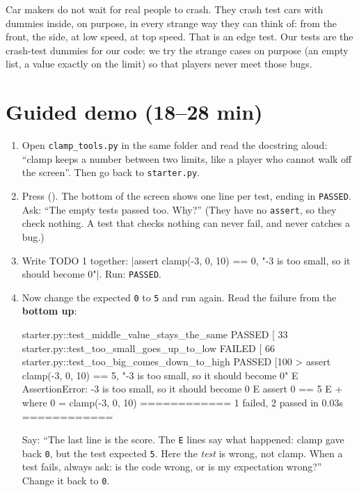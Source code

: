 \begin{analogy}
Car makers do not wait for real people to crash. They crash test cars with dummies inside, on purpose, in every strange way they can think of:
from the front, the side, at low speed, at top speed. That is an edge test. Our tests are the crash-test dummies for our code: we try the strange
cases on purpose (an empty list, a value exactly on the limit) so that players never meet those bugs.
\end{analogy}

\section{Guided demo (18--28 min)}
\begin{workedexample}
\begin{enumerate}[leftmargin=1.4em]
  \item Open \texttt{clamp\_tools.py} in the same folder and read the docstring aloud: \enquote{clamp keeps a number between two limits, like a player who
        cannot walk off the screen}. Then go back to \texttt{starter.py}.
  \item Press  (). The bottom of the screen shows one line per test, ending in \texttt{PASSED}. Ask: \enquote{The empty tests passed too.
        Why?} (They have no \texttt{assert}, so they check nothing. A test that checks nothing can never fail, and never catches a bug.)
  \item Write TODO 1 together: \py|assert clamp(-3, 0, 10) == 0, "-3 is too small, so it should become 0"|. Run: \texttt{PASSED}.
  \item Now change the expected \texttt{0} to \texttt{5} and run again. Read the failure from the \textbf{bottom up}:
\begin{outputcode}
starter.py::test_middle_value_stays_the_same PASSED     [ 33%
starter.py::test_too_small_goes_up_to_low FAILED        [ 66%
starter.py::test_too_big_comes_down_to_high PASSED      [100%
>       assert clamp(-3, 0, 10) == 5, "-3 is too small, so it should become 0"
E       AssertionError: -3 is too small, so it should become 0
E       assert 0 == 5
E        +  where 0 = clamp(-3, 0, 10)
============ 1 failed, 2 passed in 0.03s ============
\end{outputcode}
        Say: \enquote{The last line is the score. The \texttt{E} lines say what happened: clamp gave back \texttt{0}, but the test expected \texttt{5}.
        Here the \emph{test} is wrong, not clamp. When a test fails, always ask: is the code wrong, or is my expectation wrong?} Change it back to \texttt{0}.

\end{enumerate}
\end{workedexample}
